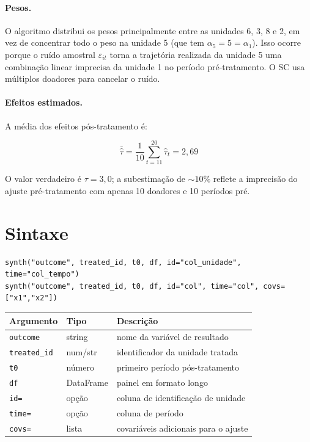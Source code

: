 \paragraph{Pesos.}
O algoritmo distribui os pesos principalmente entre as unidades 6, 3, 8 e
2, em vez de concentrar todo o peso na unidade 5 (que tem $\alpha_5 = 5 =
\alpha_1$). Isso ocorre porque o ruído amostral $\varepsilon_{it}$ torna a
trajetória realizada da unidade 5 uma combinação linear imprecisa da
unidade 1 no período pré-tratamento. O SC usa múltiplos doadores para
cancelar o ruído.

\paragraph{Efeitos estimados.}
A média dos efeitos pós-tratamento é:

\[
  \bar{\hat\tau} = \frac{1}{10}\sum_{t=11}^{20}\hat\tau_t = 2{,}69
\]

O valor verdadeiro é $\tau = 3{,}0$; a subestimação de ${\sim}10\%$ reflete
a imprecisão do ajuste pré-tratamento com apenas 10 doadores e 10 períodos
pré.

\section{Sintaxe}

\begin{lstlisting}
synth("outcome", treated_id, t0, df, id="col_unidade", time="col_tempo")
synth("outcome", treated_id, t0, df, id="col", time="col", covs=["x1","x2"])
\end{lstlisting}

\begin{center}
\begin{tabular}{lll}
\toprule
\textbf{Argumento} & \textbf{Tipo} & \textbf{Descrição} \\
\midrule
\texttt{outcome}    & string & nome da variável de resultado \\
\texttt{treated\_id}& num/str& identificador da unidade tratada \\
\texttt{t0}         & número & primeiro período pós-tratamento \\
\texttt{df}         & DataFrame & painel em formato longo \\
\texttt{id=}        & opção  & coluna de identificação de unidade \\
\texttt{time=}      & opção  & coluna de período \\
\texttt{covs=}      & lista  & covariáveis adicionais para o ajuste \\
\bottomrule
\end{tabular}
\end{center}

